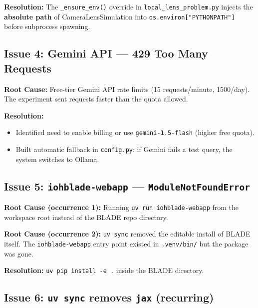 \documentclass[a4paper,11pt]{article}
\begin{document}
\textbf{Resolution:} The \texttt{\_ensure\_env()} override in
\texttt{local\_lens\_problem.py} injects the \textbf{absolute path} of
CameraLensSimulation into \texttt{os.environ["PYTHONPATH"]} before
subprocess spawning.

\subsection{Issue 4: Gemini API — 429 Too Many Requests}

\textbf{Root Cause:} Free-tier Gemini API rate limits (15 requests/minute,
1500/day). The experiment sent requests faster than the quota allowed.

\textbf{Resolution:}
\begin{itemize}
    \item Identified need to enable billing or use
          \texttt{gemini-1.5-flash} (higher free quota).
    \item Built automatic fallback in \texttt{config.py}: if Gemini fails a
          test query, the system switches to Ollama.
\end{itemize}

\subsection{Issue 5: \texttt{iohblade-webapp} — \texttt{ModuleNotFoundError}}

\textbf{Root Cause (occurrence 1):} Running \texttt{uv run iohblade-webapp}
from the workspace root instead of the BLADE repo directory.

\textbf{Root Cause (occurrence 2):} \texttt{uv sync} removed the editable
install of BLADE itself. The \texttt{iohblade-webapp} entry point existed in
\texttt{.venv/bin/} but the package was gone.

\textbf{Resolution:} \texttt{uv pip install -e .} inside the BLADE directory.

\subsection{Issue 6: \texttt{uv sync} removes \texttt{jax} (recurring)}
\end{document}
